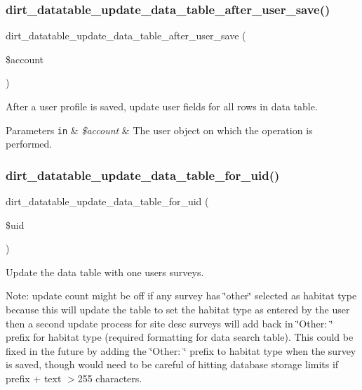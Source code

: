\subsubsection{\texorpdfstring{dirt\+\_\+datatable\+\_\+update\+\_\+data\+\_\+table\+\_\+after\+\_\+user\+\_\+save()}{dirt\_datatable\_update\_data\_table\_after\_user\_save()}}
{\footnotesize\ttfamily dirt\+\_\+datatable\+\_\+update\+\_\+data\+\_\+table\+\_\+after\+\_\+user\+\_\+save (\begin{DoxyParamCaption}\item[{}]{\$account }\end{DoxyParamCaption})}

After a user profile is saved, update user fields for all rows in data table.


\begin{DoxyParams}[1]{Parameters}
\mbox{\tt in}  & {\em \$account} & The user object on which the operation is performed. \\
\hline
\end{DoxyParams}
\mbox{\label{dirt__datatable_8search__table__db__ops_8inc_a22267f033abe6aefeb6b4d152407ca3e}} 
\subsubsection{\texorpdfstring{dirt\+\_\+datatable\+\_\+update\+\_\+data\+\_\+table\+\_\+for\+\_\+uid()}{dirt\_datatable\_update\_data\_table\_for\_uid()}}
{\footnotesize\ttfamily dirt\+\_\+datatable\+\_\+update\+\_\+data\+\_\+table\+\_\+for\+\_\+uid (\begin{DoxyParamCaption}\item[{}]{\$uid }\end{DoxyParamCaption})}

Update the data table with one user\textquotesingle{}s surveys.

Note\+: update count might be off if any survey has \char`\"{}other\char`\"{} selected as habitat type because this will update the table to set the habitat type as entered by the user then a second update process for site desc surveys will add back in \char`\"{}\+Other\+: \char`\"{} prefix for habitat type (required formatting for data search table). This could be fixed in the future by adding the \char`\"{}\+Other\+: \char`\"{} prefix to habitat type when the survey is saved, though would need to be careful of hitting database storage limits if prefix + text $>$255 characters.


